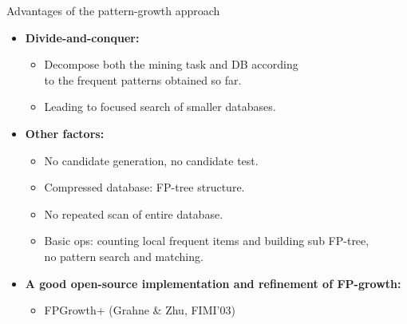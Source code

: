 \documentclass[aspectratio=169,t,xcolor=dvipsnames]{beamer}
\begin{document}
  {
    \begin{frame}{Advantages of the pattern-growth approach}
    \begin{itemize}
      \item \textbf{Divide-and-conquer:}
      \begin{itemize}
        \item Decompose both the mining task and DB according \\
         to the frequent patterns obtained so far.
        \item Leading to focused search of smaller databases.
      \end{itemize}
      \item \textbf{Other factors:}
      \begin{itemize}
        \item No candidate generation, no candidate test.
        \item Compressed database: FP-tree structure.
        \item No repeated scan of entire database.
        \item Basic ops: counting local frequent items and building sub FP-tree,\\
        no pattern search and matching.
      \end{itemize}
      \item \textbf{A good open-source implementation and refinement of FP-growth:}
      \begin{itemize}
        \item FPGrowth+ (Grahne \& Zhu, FIMI'03)
      \end{itemize}
    \end{itemize}
    \end{frame}
  }
\end{document}
